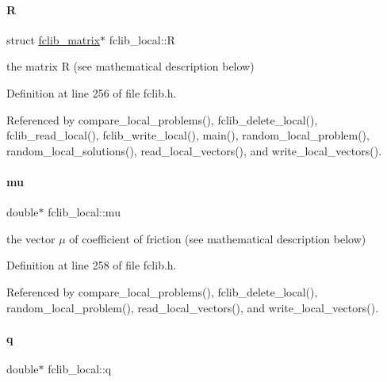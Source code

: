 \mbox{\label{structfclib__local_ae08751b33a0771d54d48aee48f838ced}} 
\paragraph{\texorpdfstring{R}{R}}
{\footnotesize\ttfamily struct \mbox{\hyperlink{structfclib__matrix}{fclib\+\_\+matrix}}$\ast$ fclib\+\_\+local\+::R}



the matrix R (see mathematical description below) 



Definition at line 256 of file fclib.\+h.



Referenced by compare\+\_\+local\+\_\+problems(), fclib\+\_\+delete\+\_\+local(), fclib\+\_\+read\+\_\+local(), fclib\+\_\+write\+\_\+local(), main(), random\+\_\+local\+\_\+problem(), random\+\_\+local\+\_\+solutions(), read\+\_\+local\+\_\+vectors(), and write\+\_\+local\+\_\+vectors().

\mbox{\label{structfclib__local_a90d9490cac0bc9b69fd13253882f1557}} 
\paragraph{\texorpdfstring{mu}{mu}}
{\footnotesize\ttfamily double$\ast$ fclib\+\_\+local\+::mu}



the vector $\mu$ of coefficient of friction (see mathematical description below) 



Definition at line 258 of file fclib.\+h.



Referenced by compare\+\_\+local\+\_\+problems(), fclib\+\_\+delete\+\_\+local(), random\+\_\+local\+\_\+problem(), read\+\_\+local\+\_\+vectors(), and write\+\_\+local\+\_\+vectors().

\mbox{\label{structfclib__local_a9a032092a828a13a7e106cce4ba7ad96}} 
\paragraph{\texorpdfstring{q}{q}}
{\footnotesize\ttfamily double$\ast$ fclib\+\_\+local\+::q}



